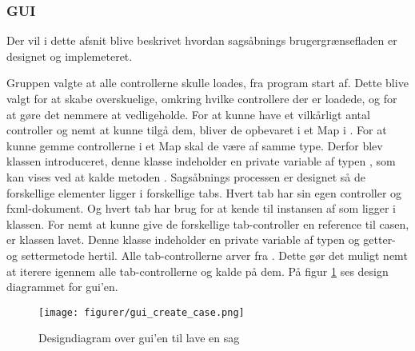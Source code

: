 \documentclass[../../main.tex]{subfiles}
\begin{document}
\subsubsection{GUI}


Der vil i dette afsnit blive beskrivet hvordan sagsåbnings brugergrænsefladen er designet og implemeteret.

Gruppen valgte at alle controllerne skulle loades, fra program start af. Dette blive valgt for at skabe overskuelige, omkring hvilke controllere der er loadede, og for at gøre det nemmere at vedligeholde. For at kunne have et vilkårligt antal controller og nemt at kunne tilgå dem, bliver de opbevaret i et Map i . For at kunne gemme controllerne i et Map skal de være af samme type. Derfor blev klassen  introduceret, denne klasse indeholder en private variable  af typen , som kan vises ved at kalde metoden . Sagsåbnings processen er designet så de forskellige elementer ligger i forskellige tabs. Hvert tab har sin egen controller og fxml-dokument. Og hvert tab har brug for at kende til instansen af  som ligger i  klassen. For nemt at kunne give de forskellige tab-controller en reference til casen, er klassen  lavet. Denne klasse indeholder en private variable  af typen  og getter- og settermetode hertil. Alle tab-controllerne arver fra . Dette gør det muligt nemt at iterere igennem alle tab-controllerne og kalde  på dem. På figur \ref{fig:gui_create_case} ses design diagrammet for gui'en. 

\begin{figure}[H]
  \centering
  \texttt{[image: figurer/gui\_create\_case.png]}
  \caption{Designdiagram over gui'en til lave en sag}
  \label{fig:gui_create_case}
\end{figure}
\end{document}
